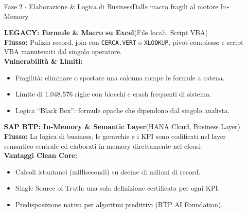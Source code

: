 \documentclass[a4paper,10pt]{extarticle}
\begin{document}
\vspace{-4pt}

\begin{wfphasebox}{Fase 2 $\cdot$ Elaborazione \& Logica di Business}{Dalle macro fragili al motore In-Memory}
  \begin{tcbraster}[raster columns=2, raster equal height, raster column skip=5pt]
    \begin{tcolorbox}[cardbase, colback=legacybg, colframe=legacyred, leftrule=2.5pt]
      \fontsize{7.3}{8.9}\selectfont
      \textbf{\color{legacydarkred}LEGACY: Formule \& Macro su Excel}\hfill\color{textmuted}(File locali, Script VBA)\\
      \textbf{Flusso:} Pulizia record, join con \texttt{CERCA.VERT} o \texttt{XLOOKUP}, pivot complesse e script VBA manutenuti dal singolo operatore.\\
      \textbf{\color{legacydarkred}Vulnerabilit\`a \& Limiti:}
      \begin{itemize}[leftmargin=8pt, itemsep=0pt, topsep=1pt]
        \item Fragilit\`a: eliminare o spostare una colonna rompe le formule a catena.
        \item Limite di 1.048.576 righe con blocchi e crash frequenti di sistema.
        \item Logica ``Black Box'': formule opache che dipendono dal singolo analista.
      \end{itemize}
    \end{tcolorbox}
    \begin{tcolorbox}[cardbase, colback=modernbg, colframe=modernteal, leftrule=2.5pt]
      \fontsize{7.3}{8.9}\selectfont
      \textbf{\color{moderndarkteal}SAP BTP: In-Memory \& Semantic Layer}\hfill\color{textmuted}(HANA Cloud, Business Layer)\\
      \textbf{Flusso:} La logica di business, le gerarchie e i KPI sono codificati nel layer semantico centrale ed elaborati in-memory direttamente nel cloud.\\
      \textbf{\color{moderndarkteal}Vantaggi Clean Core:}
      \begin{itemize}[leftmargin=8pt, itemsep=0pt, topsep=1pt]
        \item Calcoli istantanei (millisecondi) su decine di milioni di record.
        \item Single Source of Truth: una sola definizione certificata per ogni KPI.
        \item Predisposizione nativa per algoritmi predittivi (BTP AI Foundation).
      \end{itemize}
    \end{tcolorbox}
  \end{tcbraster}
\end{wfphasebox}
\end{document}
